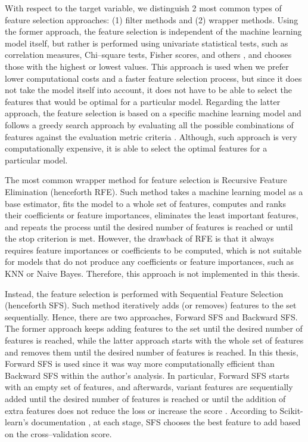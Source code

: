 With respect to the target variable, we distinguish 2 most common types of feature selection approaches: (1) filter methods and (2) wrapper methods.
Using the former approach, the feature selection is independent of the machine learning model itself, but rather is performed using univariate statistical tests, such as correlation measures, Chi--square tests, Fisher scores, and others \citep{kaushik2016introduction}, and chooses those with the highest or lowest values.
This approach is used when we prefer lower computational costs and a faster feature selection process, but since it does not take the model itself into account, it does not have to be able to select the features that would be optimal for a particular model.
Regarding the latter approach, the feature selection is based on a specific machine learning model and follows a greedy search approach by evaluating all the possible combinations of features against the evaluation metric criteria \citep{Verma2020}. Although, such approach is very computationally expensive, it is able to select the optimal features for a particular model.


The most common wrapper method for feature selection is Recursive Feature Elimination (henceforth RFE). Such method takes a machine learning model as a base estimator, fits the model to a whole set of features, computes and ranks their coefficients or feature importances, eliminates the least important features, and repeats the process until the desired number of features is reached \citep{Brownlee2020} or until the stop criterion is met.
However, the drawback of RFE is that it always requires feature importances or coefficients to be computed, which is not suitable for models that do not produce any coefficients or feature importances, such as KNN or Naive Bayes. Therefore, this approach is not implemented in this thesis.


Instead, the feature selection is performed with Sequential Feature Selection (henceforth SFS). Such method iteratively adds (or removes) features to the set sequentially. Hence, there are two approaches, Forward SFS and Backward SFS.
The former approach keeps adding features to the set until the desired number of features is reached, while the latter approach starts with the whole set of features and removes them until the desired number of features is reached.
In this thesis, Forward SFS is used since it was way more computationally efficient than Backward SFS within the author's analysis. In particular, Forward SFS starts with an empty set of features, and afterwards, variant features are sequentially added until the desired number of features is reached or until the addition of extra features does not reduce the loss or increase the score \citep{Verma2021}.
According to Scikit-learn's documentation \citep{sfs}, at each stage, SFS chooses the best feature to add based on the cross--validation score.


